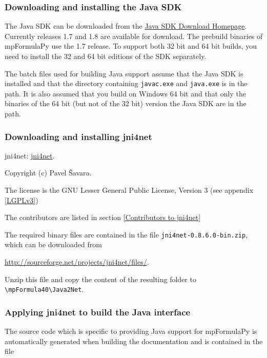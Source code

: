 \subsubsection{Downloading and installing the Java SDK}

The Java SDK can be downloaded from the \href{http://www.oracle.com/technetwork/java/javase/downloads/index.html}{Java SDK Download Homepage}. Currently releases 1.7 and 1.8 are available for download. The prebuild binaries of mpFormulaPy use the 1.7 release. To support both 32 bit and 64 bit builds, you need to install the 32 and 64 bit editions of the SDK separately.

The batch files used for building Java support assume that the Java SDK is installed and that the directory containing \verb|javac.exe| and \verb|java.exe| is in the path. It is also assumed that you build on Windows 64 bit and that only the binaries of the 64 bit (but not of the 32 bit) version the Java SDK are in the path. 


\subsubsection{Downloading and installing jni4net}

jni4net: \href{http://jni4net.com/}{jni4net}. 

Copyright (c) Pavel \^{S}avara.


The license is the GNU Lesser General Public License, Version 3 (see appendix \ref{LGPLv3})

The contributors are listed in section \ref{Contributors to jni4net}

\vpara
The required binary files are contained in the file \verb|jni4net-0.8.6.0-bin.zip|, which can be downloaded from 

\href{http://sourceforge.net/projects/jni4net/files/}{http://sourceforge.net/projects/jni4net/files/}.



Unzip this file and copy the content of the resulting folder to \verb|\mpFormula40\Java2Net|. 

\subsubsection{Applying jni4net to build the Java interface}
The source code which is specific to providing Java support for mpFormulaPy is automatically generated when building the documentation and is contained in the file 

